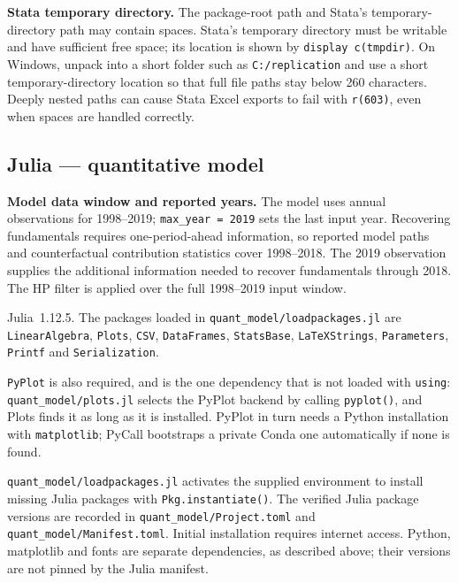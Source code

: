 \documentclass[11pt]{article}
\newcommand{\pkgfile}[1]{\nolinkurl{#1}}
\begin{document}
\noindent\textbf{Stata temporary directory.}
The package-root path and Stata's temporary-directory path may contain
spaces. Stata's temporary directory must be writable and have sufficient
free space; its location is shown by \texttt{display c(tmpdir)}.
On Windows, unpack into a short folder such as \pkgfile{C:/replication}
and use a short temporary-directory location so that full file paths stay
below 260 characters. Deeply nested paths can cause Stata Excel exports
to fail with \texttt{r(603)}, even when spaces are handled correctly.

\subsection*{Julia --- quantitative model}

\noindent\textbf{Model data window and reported years.}
The model uses annual observations for 1998--2019; \texttt{max\_year = 2019}
sets the last input year. Recovering fundamentals requires one-period-ahead
information, so reported model paths and counterfactual contribution statistics
cover 1998--2018. The 2019 observation supplies the additional information needed
to recover fundamentals through 2018. The HP filter is applied over the full
1998--2019 input window.

Julia~1.12.5. The packages loaded in \pkgfile{quant_model/loadpackages.jl} are
\texttt{LinearAlgebra}, \texttt{Plots}, \texttt{CSV}, \texttt{DataFrames},
\texttt{StatsBase}, \texttt{LaTeXStrings},
\texttt{Parameters}, \texttt{Printf} and \texttt{Serialization}.

\texttt{PyPlot} is also required, and is the one dependency that is not
loaded with \texttt{using}: \pkgfile{quant_model/plots.jl} selects the PyPlot
backend by calling \texttt{pyplot()}, and Plots finds it as long as it is
installed. PyPlot in turn needs a Python installation with
\texttt{matplotlib}; PyCall bootstraps a private Conda one automatically if
none is found.

\pkgfile{quant_model/loadpackages.jl} activates the supplied environment
to install missing Julia packages with
\texttt{Pkg.instantiate()}.
The verified Julia package versions are recorded in
\pkgfile{quant_model/Project.toml} and \pkgfile{quant_model/Manifest.toml}.
Initial installation requires internet access. Python, matplotlib and
fonts are separate dependencies, as described above; their versions are
not pinned by the Julia manifest.



\end{document}
